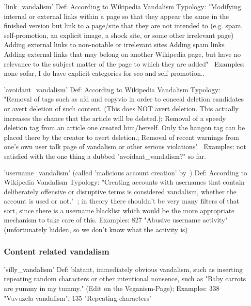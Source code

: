 'link\_vandalism'
  Def: According to Wikipedia Vandalism Typology: "Modifying internal or external links within a page so that they appear the same in the finished version but link to a page/site that they are not intended to (e.g. spam, self-promotion, an explicit image, a shock site, or some other irrelevant page)
    Adding external links to non-notable or irrelevant sites
    Adding spam links
    Adding external links that may belong on another Wikipedia page, but have no relevance to the subject matter of the page to which they are added"~\cite{Wikipedia:VandalismTypes}
  Examples: none sofar, I do have explicit categories for seo and self promotion.. %

'avoidant\_vandalism'
  Def: According to Wikipedia Vandalism Typology: "Removal of tags such as {{afd}} and {{copyvio}} in order to conceal deletion candidates or avert deletion of such content. (This does NOT avert deletion. This actually increases the chance that the article will be deleted.); Removal of a {{speedy deletion}} tag from an article one created him/herself. Only the {{hangon}} tag can be placed there by the creator to avert deletion.; Removal of recent warnings from one's own user talk page of vandalism or other serious violations"~\cite{Wikipedia:VandalismTypes}
  Examples: not satisfied with the one thing a dubbed "avoidant\_vandalism?" so far.

'username\_vandalism' (called 'malicious account creation' by~\cite{Wikipedia:VandalismTypes})
  Def: According to Wikipedia Vandalism Typology: "Creating accounts with usernames that contain deliberately offensive or disruptive terms is considered vandalism, whether the account is used or not."~\cite{Wikipedia:VandalismTypes}; in theory there shouldn't be very many filters of that sort, since there is a username blacklist which would be the more appropriate mechanism to take care of this.
  Examples: 827 "Abusive username activity" (unfortunately hidden, so we don't know what the activity is)

\subsubsection{Content related vandalism}

'silly\_vandalism'
  Def: blatant, immediately obvious vandalism, such as inserting repeating random characters or other intentional nonsence, such as "Baby carrots are yummy in my tummy." (Edit on the Veganism-Page);
  Examples: 338 "Vuvuzela vandalism", 135 "Repeating characters"

